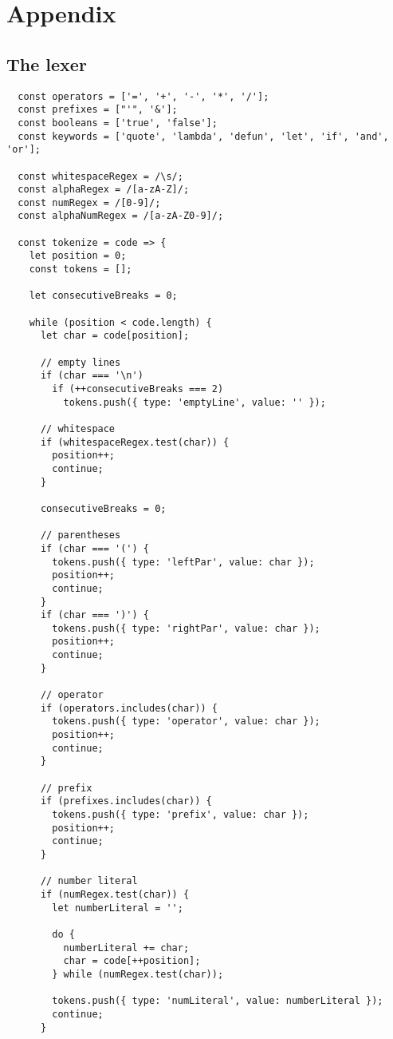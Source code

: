 \chapter*{Appendix}
\section*{The lexer}
\begin{verbatim}
  const operators = ['=', '+', '-', '*', '/'];
  const prefixes = ["'", '&'];
  const booleans = ['true', 'false'];
  const keywords = ['quote', 'lambda', 'defun', 'let', 'if', 'and', 'or'];

  const whitespaceRegex = /\s/;
  const alphaRegex = /[a-zA-Z]/;
  const numRegex = /[0-9]/;
  const alphaNumRegex = /[a-zA-Z0-9]/;

  const tokenize = code => {
    let position = 0;
    const tokens = [];

    let consecutiveBreaks = 0;

    while (position < code.length) {
      let char = code[position];

      // empty lines
      if (char === '\n')
        if (++consecutiveBreaks === 2)
          tokens.push({ type: 'emptyLine', value: '' });

      // whitespace
      if (whitespaceRegex.test(char)) {
        position++;
        continue;
      }

      consecutiveBreaks = 0;

      // parentheses
      if (char === '(') {
        tokens.push({ type: 'leftPar', value: char });
        position++;
        continue;
      }
      if (char === ')') {
        tokens.push({ type: 'rightPar', value: char });
        position++;
        continue;
      }

      // operator
      if (operators.includes(char)) {
        tokens.push({ type: 'operator', value: char });
        position++;
        continue;
      }

      // prefix
      if (prefixes.includes(char)) {
        tokens.push({ type: 'prefix', value: char });
        position++;
        continue;
      }

      // number literal
      if (numRegex.test(char)) {
        let numberLiteral = '';

        do {
          numberLiteral += char;
          char = code[++position];
        } while (numRegex.test(char));

        tokens.push({ type: 'numLiteral', value: numberLiteral });
        continue;
      }


\end{verbatim}
